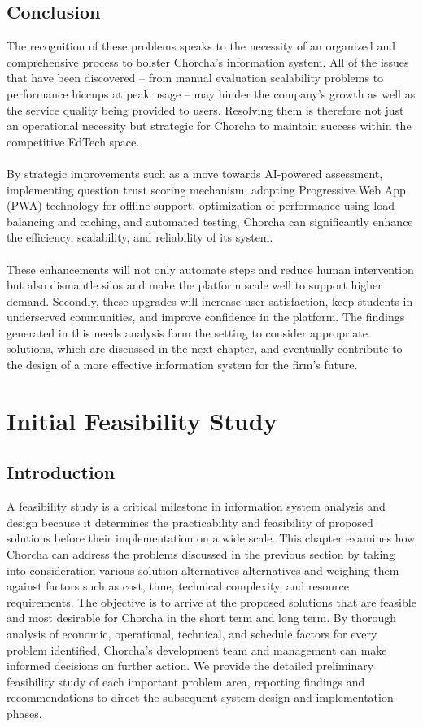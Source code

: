 \documentclass[12pt,a4paper,oneside]{book}
\begin{document}
\section{Conclusion}
The recognition of these problems speaks to the necessity of an organized and comprehensive process to bolster Chorcha's information system. All of the issues that have been discovered – from manual evaluation scalability problems to performance hiccups at peak usage – may hinder the company's growth as well as the service quality being provided to users. Resolving them is therefore not just an operational necessity but strategic for Chorcha to maintain success within the competitive EdTech space.
\\ \\By strategic improvements such as a move towards AI-powered assessment, implementing question trust scoring mechanism, adopting Progressive Web App (PWA) technology for offline support, optimization of performance using load balancing and caching, and automated testing, Chorcha can significantly enhance the efficiency, scalability, and reliability of its system.
\\ \\These enhancements will not only automate steps and reduce human intervention but also dismantle silos and make the platform scale well to support higher demand. Secondly, these upgrades will increase user satisfaction, keep students in underserved communities, and improve confidence in the platform. The findings generated in this needs analysis form the setting to consider appropriate solutions, which are discussed in the next chapter, and eventually contribute to the design of a more effective information system for the firm's future.

\newpage

\chapter{Initial Feasibility Study}
\section{Introduction}
A feasibility study is a critical milestone in information system analysis and design because it determines the practicability and feasibility of proposed solutions before their implementation on a wide scale. This chapter examines how Chorcha can address the problems discussed in the previous section by taking into consideration various solution alternatives alternatives and weighing them against factors such as cost, time, technical
complexity, and resource requirements. The objective is to arrive at the proposed solutions that are feasible and most desirable for Chorcha in the short term and long term. By thorough analysis of economic, operational, technical, and schedule factors for every problem identified, Chorcha's development team and management can make informed decisions on further action. We provide the detailed preliminary feasibility study of each important problem area, reporting findings and recommendations to direct the subsequent system design and implementation phases.
\end{document}
